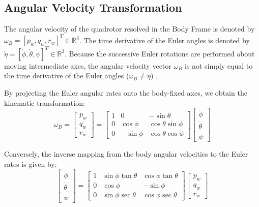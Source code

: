 \subsection{Angular Velocity Transformation}
The angular velocity of the quadrotor resolved in the Body Frame is denoted by $\omega_B = [p_w, q_w, r_w]^T \in \mathbb{R}^3$. The time derivative of the Euler angles is denoted by $\dot{\eta} = [\dot{\phi}, \dot{\theta}, \dot{\psi}]^T \in \mathbb{R}^3$. Because the successive Euler rotations are performed about moving intermediate axes, the angular velocity vector $\omega_B$ is not simply equal to the time derivative of the Euler angles ($\omega_B \neq \dot{\eta}$) \cite{ref_59}. 

By projecting the Euler angular rates onto the body-fixed axes, we obtain the kinematic transformation:
\begin{equation}
\omega_B = \begin{bmatrix} p_w \\ q_w \\ r_w \end{bmatrix} = \begin{bmatrix} 1 & 0 & -\sin\theta \\ 0 & \cos\phi & \cos\theta\sin\phi \\ 0 & -\sin\phi & \cos\theta\cos\phi \end{bmatrix} \begin{bmatrix} \dot{\phi} \\ \dot{\theta} \\ \dot{\psi} \end{bmatrix}
\end{equation}

Conversely, the inverse mapping from the body angular velocities to the Euler rates is given by:
\begin{equation}
\begin{bmatrix} \dot{\phi} \\ \dot{\theta} \\ \dot{\psi} \end{bmatrix} = \begin{bmatrix} 1 & \sin\phi\tan\theta & \cos\phi\tan\theta \\ 0 & \cos\phi & -\sin\phi \\ 0 & \sin\phi\sec\theta & \cos\phi\sec\theta \end{bmatrix} \begin{bmatrix} p_w \\ q_w \\ r_w \end{bmatrix}
\end{equation}

